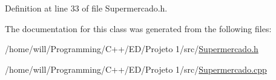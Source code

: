 Definition at line 33 of file Supermercado.h.



The documentation for this class was generated from the following files:\begin{DoxyCompactItemize}
\item 
/home/will/Programming/C++/ED/Projeto 1/src/\hyperlink{Supermercado_8h}{Supermercado.h}\item 
/home/will/Programming/C++/ED/Projeto 1/src/\hyperlink{Supermercado_8cpp}{Supermercado.cpp}\end{DoxyCompactItemize}
